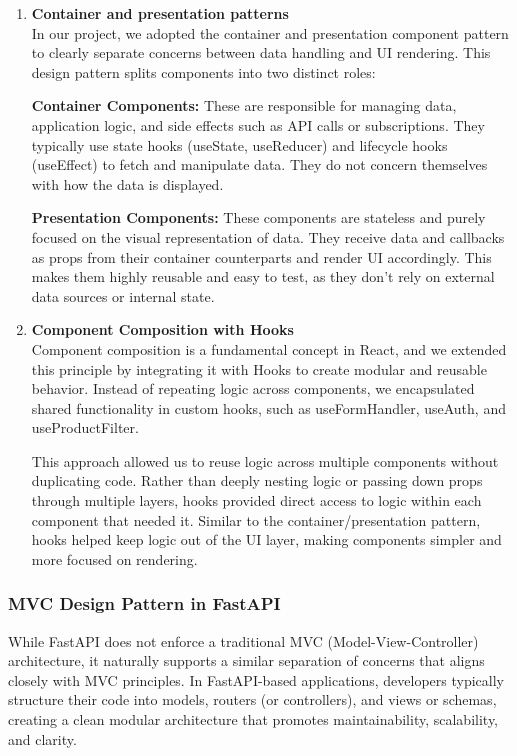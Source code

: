 \begin{enumerate}
    \item \textbf{Container and presentation patterns} \\
In our project, we adopted the container and presentation component pattern to clearly separate concerns between data handling and UI rendering. This design pattern splits components into two distinct roles:

\textbf{Container Components:} These are responsible for managing data, application logic, and side effects such as API calls or subscriptions. They typically use state hooks (useState, useReducer) and lifecycle hooks (useEffect) to fetch and manipulate data. They do not concern themselves with how the data is displayed.

\textbf{Presentation Components:} These components are stateless and purely focused on the visual representation of data. They receive data and callbacks as props from their container counterparts and render UI accordingly. This makes them highly reusable and easy to test, as they don't rely on external data sources or internal state.



\item \textbf{Component Composition with Hooks} \\
Component composition is a fundamental concept in React, and we extended this principle by integrating it with Hooks to create modular and reusable behavior. Instead of repeating logic across components, we encapsulated shared functionality in custom hooks, such as useFormHandler, useAuth, and useProductFilter.

This approach allowed us to reuse logic across multiple components without duplicating code. Rather than deeply nesting logic or passing down props through multiple layers, hooks provided direct access to logic within each component that needed it. Similar to the container/presentation pattern, hooks helped keep logic out of the UI layer, making components simpler and more focused on rendering.


\end{enumerate}

\subsubsection{MVC Design Pattern in FastAPI}
While FastAPI does not enforce a traditional MVC (Model-View-Controller) architecture, it naturally supports a similar separation of concerns that aligns closely with MVC principles. In FastAPI-based applications, developers typically structure their code into models, routers (or controllers), and views or schemas, creating a clean modular architecture that promotes maintainability, scalability, and clarity.

